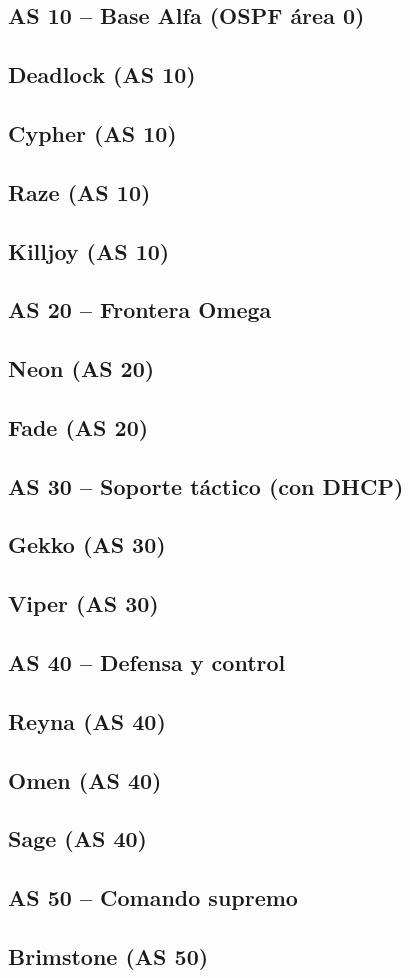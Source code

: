 \newcommand{\registro}[2]{%
  \subsection{#1 (AS #2)}
  }

\subsection*{AS 10 -- Base Alfa (OSPF área 0)}
\registro{Deadlock}{10}
\registro{Cypher}{10}
\registro{Raze}{10}
\registro{Killjoy}{10}

\subsection*{AS 20 -- Frontera Omega}
\registro{Neon}{20}
\registro{Fade}{20}

\subsection*{AS 30 -- Soporte táctico (con DHCP)}
\registro{Gekko}{30}
\registro{Viper}{30}

\subsection*{AS 40 -- Defensa y control}
\registro{Reyna}{40}
\registro{Omen}{40}
\registro{Sage}{40}

\subsection*{AS 50 -- Comando supremo}
\registro{Brimstone}{50}
